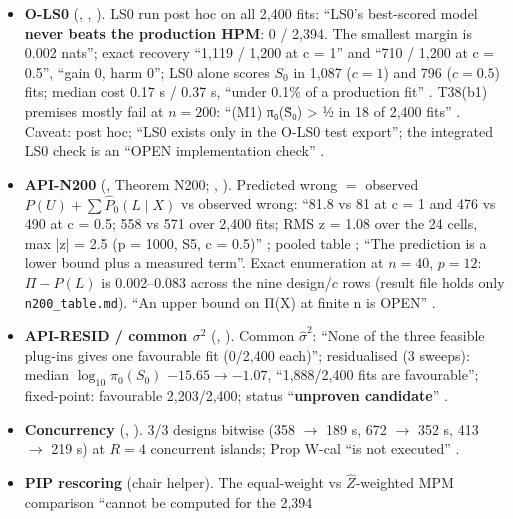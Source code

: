 \begin{itemize}
\item {} \textbf{O-LS0} (, , ). LS0 run post hoc on all 2,400 fits: ``LS0's best-scored model
\textbf{never beats the production HPM}: 0 / 2,394. The smallest margin is 0.002 nats''; exact recovery ``1,119 / 1,200 at c = 1''
and ``710 / 1,200 at c = 0.5'', ``gain 0, harm 0''; LS0 alone scores $S_0$ in 1,087 ($c=1$) and 796 ($c=0.5$) fits; median cost 0.17 s
/ 0.37 s, ``under 0.1\% of a production fit'' . T38(b1) premises mostly fail at $n=200$:
``(M1) π₀(S̃₀) > ½ in 18 of 2,400 fits'' . Caveat: post hoc; ``LS0 exists only in the O-LS0
test export''; the integrated LS0 check is an ``OPEN implementation check'' .
\item {} \textbf{API-N200} (, Theorem N200; , ). Predicted wrong $=$ observed $P(U)+\sum\hat
P_0(L\mid X)$ vs observed wrong: ``81.8 vs 81 at c = 1 and 476 vs 490 at c = 0.5; 558 vs 571 over 2,400 fits; RMS z = 1.08 over the 24
cells, max |z| = 2.5 (p = 1000, S5, c = 0.5)'' ; pooled table
; ``The prediction is a lower bound plus a measured term''. Exact enumeration at
$n=40$, $p=12$: $\Pi-P(L)$ is 0.002--0.083 across the nine design/$c$ rows 
(result file  holds only \texttt{n200\_table.md}). ``An upper bound on Π(X) at finite n is OPEN''
.
\item {} \textbf{API-RESID / common $\sigma^2$} (, ). Common $\hat\sigma^2$: ``None of the three feasible plug-ins
gives one favourable fit (0/2,400 each)''; residualised (3 sweeps): median $\log_{10}\pi_0(S_0)$ $-15.65\to-1.07$, ``1,888/2,400 fits are
favourable''; fixed-point: favourable 2,203/2,400; status ``\textbf{unproven candidate}'' .
\item {} \textbf{Concurrency} (, ). 3/3 designs bitwise (358 $\to$ 189 s, 672 $\to$ 352 s, 413 $\to$ 219 s)
at $R=4$ concurrent islands; Prop W-cal ``is not executed'' .
\item \textbf{PIP rescoring} (chair helper). The equal-weight vs $\hat Z$-weighted MPM comparison ``cannot be computed for the 2,394

\end{itemize}
